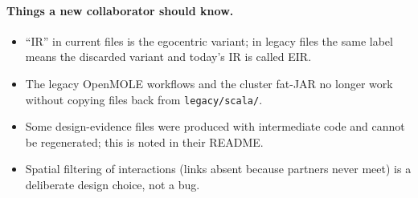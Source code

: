 \documentclass[11pt,a4paper]{article}
\newcommand{\code}[1]{\texttt{\small #1}}
\begin{document}
\paragraph{Things a new collaborator should know.}
\begin{itemize}
\item ``IR'' in current files is the egocentric variant; in legacy files the same label means the discarded
variant and today's IR is called EIR.
\item The legacy OpenMOLE workflows and the cluster fat-JAR no longer work without copying files back from
\code{legacy/scala/}.
\item Some design-evidence files were produced with intermediate code and cannot be regenerated; this is
noted in their README.
\item Spatial filtering of interactions (links absent because partners never meet) is a deliberate design
choice, not a bug.
\end{itemize}
\end{document}
